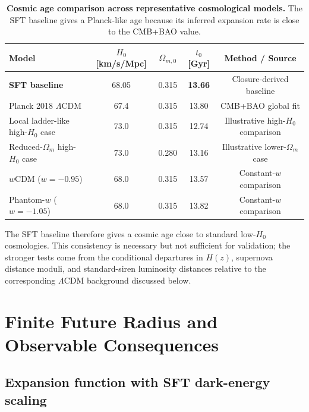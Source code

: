 \documentclass[12pt]{article}
\begin{document}
\begin{table}[h!]
\centering
\footnotesize
\setlength{\tabcolsep}{3pt}
\renewcommand{\arraystretch}{1.15}
\caption{\textbf{Cosmic age comparison across representative cosmological models.}
The SFT baseline gives a Planck-like age because its inferred expansion rate is
close to the CMB+BAO value.}
\label{tab:cosmic_age_models}
\begin{tabular}{lcccc}
\toprule
\textbf{Model} & $H_0$ [km/s/Mpc] & $\Omega_{m,0}$ & $t_0$ [Gyr] & \textbf{Method / Source} \\
\midrule
\textbf{SFT baseline} & 68.05 & 0.315 & \textbf{13.66} & Closure-derived baseline \\
Planck 2018 $\Lambda$CDM & 67.4 & 0.315 & 13.80 & CMB+BAO global fit \cite{Planck2020,Alam2021} \\
Local ladder-like high-$H_0$ case & 73.0 & 0.315 & 12.74 & Illustrative high-$H_0$ comparison \cite{Riess2022} \\
Reduced-$\Omega_m$ high-$H_0$ case & 73.0 & 0.280 & 13.16 & Illustrative lower-$\Omega_m$ case \cite{Efstathiou2021} \\
$w$CDM ($w=-0.95$) & 68.0 & 0.315 & 13.57 & Constant-$w$ comparison \cite{Planck2020,DESI2024} \\
Phantom-$w$ ($w=-1.05$) & 68.0 & 0.315 & 13.82 & Constant-$w$ comparison \cite{Planck2020,DESI2024} \\
\bottomrule
\end{tabular}
\end{table}

The SFT baseline therefore gives a cosmic age close to standard low-$H_0$
cosmologies. This consistency is necessary but not sufficient for validation;
the stronger tests come from the conditional departures in $H(z)$,
supernova distance moduli, and standard-siren luminosity distances relative
to the corresponding $\Lambda$CDM background discussed below.




\section{Finite Future Radius and Observable Consequences}
\label{sec:Rinfty_evolution}

\subsection{Expansion function with SFT dark-energy scaling}
\end{document}
